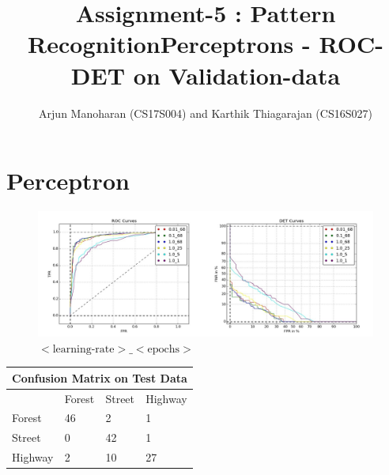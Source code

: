 \documentclass{article}
\title{Assignment-5 : Pattern Recognition}
\author{Arjun Manoharan (CS17S004) and Karthik Thiagarajan (CS16S027)}
\begin{document}
\maketitle

\tableofcontents

\newpage
\section{Perceptron}

\begin{figure}[h!]
\centering
\title{Perceptrons - ROC-DET on Validation-data}
\includegraphics[width=\textwidth]{image_data/plots/roc_det.jpg}
\caption{$<\text{learning-rate}>\_<\text{epochs}>$}
\end{figure}


\begin{table}[h!]
\centering
\begin{tabular}{ |p{1.5cm}|p{1.5cm}|p{1.5cm}|p{1.5cm}|  }
\hline
\multicolumn{4}{|c|}{Confusion Matrix on Test Data} \\
\hline
 & Forest & Street & Highway \\
\hline
Forest & 46 & 2 & 1\\
Street & 0 & 42 & 1\\
Highway & 2 & 10 & 27\\
\hline
\end{tabular}
\end{table}
\end{document}
